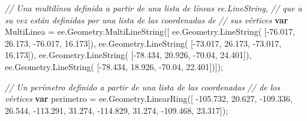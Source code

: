 \documentclass[
  12pt,
  letterpaper,
  twoside]{book}
\newenvironment{Shaded}{\begin{snugshade}}{\end{snugshade}}
\newcommand{\AttributeTok}[1]{\textcolor[rgb]{0.48,0.12,0.64}{#1}}
\newcommand{\CommentTok}[1]{\textcolor[rgb]{0.24,0.58,0.00}{\textit{#1}}}
\newcommand{\FloatTok}[1]{\textcolor[rgb]{0.28,0.53,0.93}{#1}}
\newcommand{\FunctionTok}[1]{\textcolor[rgb]{0.48,0.12,0.64}{#1}}
\newcommand{\KeywordTok}[1]{\textcolor[rgb]{0.00,0.00,0.00}{\textbf{#1}}}
\newcommand{\NormalTok}[1]{#1}
\newcommand{\OperatorTok}[1]{\textcolor[rgb]{0.00,0.00,0.00}{#1}}
\begin{document}
\begin{Shaded}
\begin{Highlighting}[]
\CommentTok{// Una multilínea definida a partir de una lista de líneas ee.LineString, }
\CommentTok{// que a su vez están definidas por una lista de las coordenadas de}
\CommentTok{// sus vértices}
\KeywordTok{var}\NormalTok{ MultiLinea }\OperatorTok{=}\NormalTok{ ee}\OperatorTok{.}\AttributeTok{Geometry}\OperatorTok{.}\FunctionTok{MultiLineString}\NormalTok{([ }
\NormalTok{   ee}\OperatorTok{.}\AttributeTok{Geometry}\OperatorTok{.}\FunctionTok{LineString}\NormalTok{(                     }
\NormalTok{     [}\OperatorTok{{-}}\FloatTok{76.017}\OperatorTok{,} \FloatTok{26.173}\OperatorTok{,} \OperatorTok{{-}}\FloatTok{76.017}\OperatorTok{,} \FloatTok{16.173}\NormalTok{])}\OperatorTok{,}      
\NormalTok{   ee}\OperatorTok{.}\AttributeTok{Geometry}\OperatorTok{.}\FunctionTok{LineString}\NormalTok{(                      }
\NormalTok{    [}\OperatorTok{{-}}\FloatTok{73.017}\OperatorTok{,} \FloatTok{26.173}\OperatorTok{,} \OperatorTok{{-}}\FloatTok{73.017}\OperatorTok{,} \FloatTok{16.173}\NormalTok{])}\OperatorTok{,}       
\NormalTok{   ee}\OperatorTok{.}\AttributeTok{Geometry}\OperatorTok{.}\FunctionTok{LineString}\NormalTok{(                      }
\NormalTok{    [}\OperatorTok{{-}}\FloatTok{78.434}\OperatorTok{,} \FloatTok{20.926}\OperatorTok{,} \OperatorTok{{-}}\FloatTok{70.04}\OperatorTok{,} \FloatTok{24.401}\NormalTok{])}\OperatorTok{,}
\NormalTok{   ee}\OperatorTok{.}\AttributeTok{Geometry}\OperatorTok{.}\FunctionTok{LineString}\NormalTok{(}
\NormalTok{    [}\OperatorTok{{-}}\FloatTok{78.434}\OperatorTok{,} \FloatTok{18.926}\OperatorTok{,} \OperatorTok{{-}}\FloatTok{70.04}\OperatorTok{,} \FloatTok{22.401}\NormalTok{])])}\OperatorTok{;}

\CommentTok{// Un perímetro definido a partir de una lista  de las coordenadas }
\CommentTok{// de los vértices}
\KeywordTok{var}\NormalTok{ perimetro }\OperatorTok{=}\NormalTok{ ee}\OperatorTok{.}\AttributeTok{Geometry}\OperatorTok{.}\FunctionTok{LinearRing}\NormalTok{([ }
  \OperatorTok{{-}}\FloatTok{105.732}\OperatorTok{,} \FloatTok{20.627}\OperatorTok{,}                      
  \OperatorTok{{-}}\FloatTok{109.336}\OperatorTok{,} \FloatTok{26.544}\OperatorTok{,}                      
  \OperatorTok{{-}}\FloatTok{113.291}\OperatorTok{,} \FloatTok{31.274}\OperatorTok{,}
  \OperatorTok{{-}}\FloatTok{114.829}\OperatorTok{,} \FloatTok{31.274}\OperatorTok{,}
  \OperatorTok{{-}}\FloatTok{109.468}\OperatorTok{,} \FloatTok{23.317}\NormalTok{])}\OperatorTok{;}
\end{Highlighting}
\end{Shaded}
\end{document}
